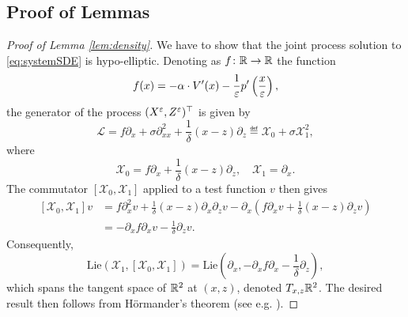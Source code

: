 \documentclass[10pt]{article}
\begin{document}
\begin{appendices}
	
\section{Proof of Lemmas}\label{ap:Proofs}

\begin{proof}[Proof of Lemma \ref{lem:density}] We have to show that the joint process solution to \eqref{eq:systemSDE} is hypo-elliptic. Denoting as $f\colon \mathbb{R} \to \mathbb{R}$ the function 
	\begin{equation}
	f(x) = -\alpha \cdot V'(x) - \frac1{\varepsilon} p'\left(\frac{x}{\varepsilon}\right),
	\end{equation}
	the generator of the process $(X^\varepsilon, Z^\varepsilon)^\top$ is given by
	\begin{equation}
	\mathcal L = f \partial_x + \sigma \partial_{xx}^2 + \frac1\delta (x - z)\partial_z \eqdef \mathcal X_0 + \sigma \mathcal X_1^2, 
	\end{equation}
	where 
	\begin{equation}
	\mathcal X_0 = f \partial_x + \frac1\delta (x - z)\partial_z, \quad \mathcal X_1 = \partial_x.
	\end{equation}
	The commutator $[\mathcal X_0, \mathcal X_1]$ applied to a test function $v$ then gives
	\begin{equation}
	\begin{aligned}
	[\mathcal X_0, \mathcal X_1]v &= f \partial_x^2 v + \frac1\delta (x - z) \partial_x \partial_z v  - \partial_x\left(f\partial_x v + \frac1\delta (x - z)\partial_z v\right)\\
	&= -\partial_x f \partial_x v - \frac1\delta \partial_z v.
	\end{aligned}
	\end{equation}
	Consequently, 
	\begin{equation}
	\mathrm{Lie}\left(\mathcal X_1, [\mathcal X_0, \mathcal X_1]\right) = \mathrm{Lie} \left(\partial_x, -\partial_x f \partial_x - \frac1\delta\partial_z\right),
	\end{equation}
	which spans the tangent space of $\mathbb{R}^2$ at $(x, z)$, denoted $T_{x, z}\mathbb{R}^2$. The desired result then follows from Hörmander's theorem (see e.g. \cite[Chapter 6]{Pav14}).
\end{proof}


\end{appendices}
\end{document}
